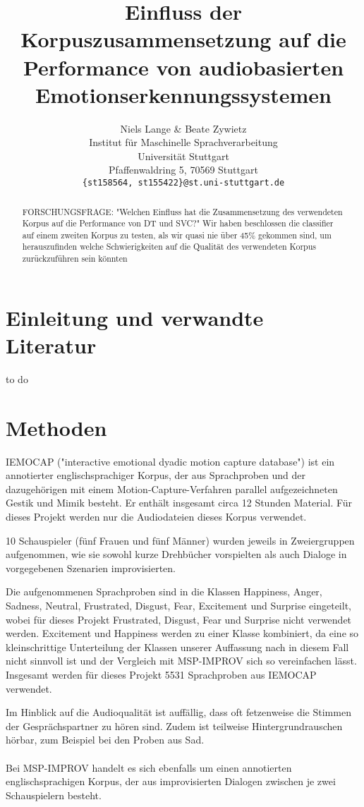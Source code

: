 \documentclass{article} %
\title{Einfluss der Korpuszusammensetzung auf die Performance von audiobasierten Emotionserkennungssystemen}
\author{Niels Lange \& Beate Zywietz\\
Institut für Maschinelle Sprachverarbeitung\\
Universität Stuttgart\\
Pfaffenwaldring 5, 70569 Stuttgart \\
\texttt{\{st158564, st155422\}@st.uni-stuttgart.de} \\
}
\begin{document}
\maketitle
\begin{abstract}

FORSCHUNGSFRAGE: "Welchen Einfluss hat die Zusammensetzung des verwendeten Korpus auf die Performance von DT und SVC?"
Wir haben beschlossen die classifier auf einem zweiten Korpus zu testen, als wir quasi nie über 45\% gekommen sind, um herauszufinden welche Schwierigkeiten auf die Qualität des verwendeten Korpus zurückzuführen sein könnten
\end{abstract}

\section{Einleitung und verwandte Literatur}

to do

\section{Methoden}

IEMOCAP ("interactive emotional dyadic motion capture
database") ist ein annotierter englischsprachiger Korpus, der aus Sprachproben und der dazugehörigen mit einem Motion-Capture-Verfahren parallel aufgezeichneten Gestik und Mimik besteht. Er enthält insgesamt circa 12 Stunden Material. Für dieses Projekt werden nur die Audiodateien dieses Korpus verwendet. 

10 Schauspieler (fünf Frauen und fünf Männer) wurden jeweils in Zweiergruppen aufgenommen, wie sie sowohl kurze Drehbücher vorspielten als auch Dialoge in vorgegebenen Szenarien improvisierten. 

Die aufgenommenen Sprachproben sind in die Klassen Happiness, Anger, Sadness, Neutral, Frustrated, Disgust, Fear, Excitement und Surprise eingeteilt, wobei für dieses Projekt Frustrated, Disgust, Fear und Surprise nicht verwendet werden. Excitement und Happiness werden zu einer Klasse kombiniert, da eine so kleinschrittige Unterteilung der Klassen unserer Auffassung nach in diesem Fall nicht sinnvoll ist und der Vergleich mit MSP-IMPROV sich so vereinfachen lässt. Insgesamt werden für dieses Projekt 5531 Sprachproben aus IEMOCAP verwendet. 

Im Hinblick auf die Audioqualität ist auffällig, dass oft fetzenweise die Stimmen der Gesprächspartner zu hören sind. Zudem ist teilweise Hintergrundrauschen hörbar, zum Beispiel bei den Proben aus Sad. \\ \\
Bei MSP-IMPROV handelt es sich ebenfalls um einen annotierten englischsprachigen Korpus, der aus improvisierten Dialogen zwischen je zwei Schauspielern besteht. 
\end{document}
